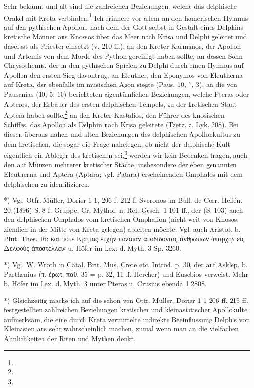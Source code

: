 \documentclass[a4paper, 11pt, oneside]{article}
\begin{document}
Sehr bekannt und alt sind die zahlreichen Beziehungen, welche das delphische Orakel mit Kreta verbinden.\footnote{} Ich erinnere vor allem an den homerischen Hymnus auf den pythischen Apollon, nach dem der Gott selbst in Gestalt eines Delphins kretische Männer aus Knossos über das Meer nach Krisa und Delphi geleitet und daselbst als Priester einsetzt (v. 210 ff.), an den Kreter Karmanor, der Apollon und Artemis von dem Morde des Python gereinigt haben sollte, an dessen Sohn Chrysothemis, der in den pythischen Spielen zu Delphi durch einen Hymnus auf Apollon den ersten Sieg davontrug, an Eleuther, den Eponymos von Eleutherna auf Kreta, der ebenfalls im musischen Agon siegte (Paus. 10, 7, 3), an die von Pausanias (10, 5, 10) berichteten eigentümlichen Beziehungen, welche Pteras oder Apteros, der Erbauer des ersten delphischen Tempels, zu der kretischen Stadt Aptera haben sollte,\footnote{} an den Kreter Kastalios, den Führer des knosischen Schiffes, das Apollon als Delphin nach Krisa geleitete (Tzetz. z. Lyk. 208). Bei diesen überaus nahen und alten Beziehungen des delphischen Apollonkultus zu dem kretischen, die sogar die Frage nahelegen, ob nicht der delphische Kult eigentlich ein Ableger des kretischen sei,\footnote{} werden wir kein Bedenken tragen, auch den auf Münzen mehrerer kretischer Städte, insbesondere der eben genannten Eleutherna und Aptera (Aptara; vgl. Patara) erscheinenden Omphalos mit dem delphischen zu identifizieren.

*) Vgl. Otfr. Müller, Dorier 1 1, 206 f. 212 f. Svoronos im Bull. de Corr. Hellén. 20 (1896) S. 8 f. Gruppe, Gr. Mythol. n. Rel.-Gesch. 1 101 ff., der (S. 103) auch den delphischen Omphalos vom kretischen Omphalion (nicht weit von Knosos, ziemlich in der Mitte von Kreta gelegen) ableiten möchte. Vgl. auch Aristot. b. Plut. Thes. 16: καί ποτε Κρῆτας εὐχὴν παλαιὰν ἀποδιδόντας ἀνθρώπων ἀπαρχὴν εἰς Δελφοὺς ἀποστέλλειν u. Höfer im Lex. d. Myth. 3 Sp. 3260.

*) Vgl. W. Wroth in Catal. Brit. Mus. Crete etc. Introd. p. 30, der auf Asklep. b. Parthenius (π. ἐρωτ. παθ. 35 = p. 32, 11 ff. Hercher) und Eusebios verweist. Mehr b. Höfer im Lex. d. Myth. 3 unter Pteras u. Crusius ebenda 1 2808.

*) Gleichzeitig mache ich auf die schon von Otfr. Müller, Dorier 1 1 206 ff. 215 ff. festgestellten zahlreichen Beziehungen kretischer und kleinasiatischer Apollokulte aufmerksam, die eine durch Kreta vermittelte indirekte Beeinflussung Delphis von Kleinasien aus sehr wahrscheinlich machen, zumal wenn man an die vielfachen Ähnlichkeiten der Riten und Mythen denkt.
\end{document}
